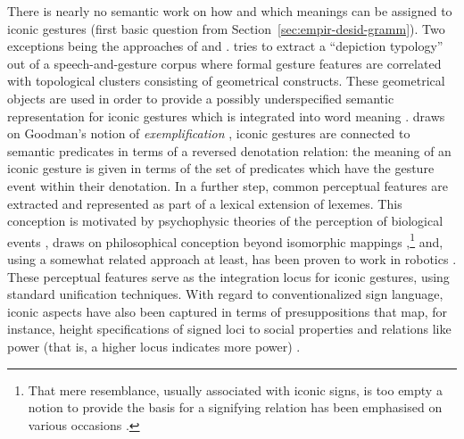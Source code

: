 \documentclass[output=paper]{langsci/langscibook}
\begin{document}
 
There is nearly no semantic work on how and which meanings can be assigned to iconic gestures (first basic question from Section~\ref{sec:empir-desid-gramm}).
%
Two exceptions being the approaches of \citet{Rieser:2010} and \citet{Luecking:2013:a,Luecking:2016}.
%
\citet{Rieser:2010} tries to extract a \enquote{depiction typology} out of a speech-and-gesture corpus where formal gesture features are correlated with topological clusters consisting of geometrical constructs. 
%
These geometrical objects are used in order to provide a possibly underspecified semantic representation for iconic gestures which is integrated into word meaning \citep{Hahn:Rieser:2010,Rieser:2011}.
%
\citet{Luecking:2013:a,Luecking:2016} draws on Goodman's notion of \emph{exemplification} \citep{Goodman:1976}, iconic gestures are connected to semantic predicates in terms of a reversed denotation relation: the meaning of an iconic gesture is given in terms of the set of predicates which have the gesture event within their denotation. 
%
In a further step, common perceptual features are extracted and represented as part of a lexical extension of lexemes. 
%
This conception is motivated by psychophysic theories of the perception of biological events \citep{Johansson:1973}, draws on philosophical  conception beyond isomorphic mappings \citep{Peacocke:1987},\footnote{\label{fn:resemblance}That mere resemblance, usually associated with iconic signs, is too empty a notion to provide the basis for a signifying relation has been emphasised on various occasions \citep{Burks:1949,Bierman:1962,Eco:1976,Goodman:1976,Sonesson:1998}.} and, using a somewhat related approach at least, has been proven to work in robotics \citep{Sowa:2006:a}.
%
These perceptual features serve as the integration locus for iconic gestures, using standard unification techniques. 
%
With regard to conventionalized sign language, iconic aspects have also been captured in terms of presuppositions that map, for instance, height specifications of signed loci to social properties and relations like power (that is, a higher locus indicates more power) \citep{Schlenker:Lamberton:Santoro:2013}.
\end{document}
